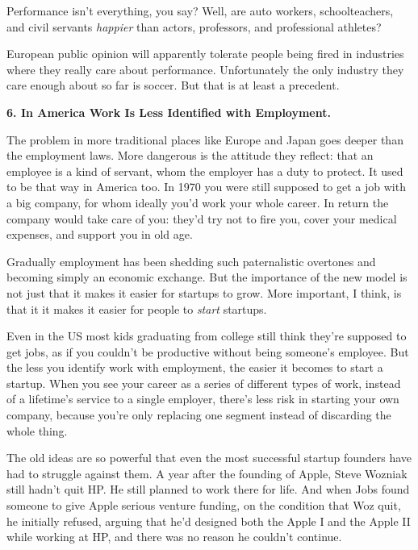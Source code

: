 Performance isn't
                  everything, you say? Well, are auto workers, schoolteachers,
                  and civil servants \emph{happier} than actors, professors, and
                  professional athletes?

European public opinion will
                  apparently tolerate people being fired in industries where
                  they really care about performance. Unfortunately the only
                  industry they care enough about so far is soccer. But that is
                  at least a precedent.

\textbf{6. In America Work Is Less Identified with Employment.}

The problem in more traditional places like
                  Europe and Japan goes deeper than the employment laws. More
                  dangerous is the attitude they reflect: that an employee is a
                  kind of servant, whom the employer has a duty to protect. It
                  used to be that way in America too. In 1970 you were still
                  supposed to get a job with a big company, for whom ideally
                  you'd work your whole career. In return the company would take
                  care of you: they'd try not to fire you, cover your medical
                  expenses, and support you in old age.

Gradually
                  employment has been shedding such paternalistic overtones and
                  becoming simply an economic exchange. But the importance of
                  the new model is not just that it makes it easier for startups
                  to grow. More important, I think, is that it it makes it
                  easier for people to \emph{start} startups.

Even in
                  the US most kids graduating from college still think they're
                  supposed to get jobs, as if you couldn't be productive without
                  being someone's employee. But the less you identify work with
                  employment, the easier it becomes to start a startup. When you
                  see your career as a series of different types of work,
                  instead of a lifetime's service to a single employer, there's
                  less risk in starting your own company, because you're only
                  replacing one segment instead of discarding the whole
                  thing.

The old ideas are so powerful that even the
                  most successful startup founders have had to struggle against
                  them. A year after the founding of Apple, Steve Wozniak still
                  hadn't quit HP. He still planned to work there for life. And
                  when Jobs found someone to give Apple serious venture funding,
                  on the condition that Woz quit, he initially refused, arguing
                  that he'd designed both the Apple I and the Apple II while
                  working at HP, and there was no reason he couldn't
                  continue.

